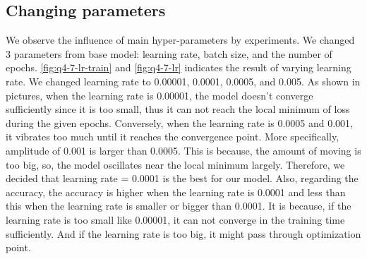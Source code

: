 \subsection{Changing parameters}
We observe the influence of main hyper-parameters by experiments. We changed 3 parameters from base model: learning rate, batch size, and the number of epochs. \cref{fig:q4-7-lr-train} and \cref{fig:q4-7-lr} indicates the result of varying learning rate. We changed learning rate to 0.00001, 0.0001, 0.0005, and 0.005. As shown in pictures, when the learning rate is 0.00001, the model doesn't converge sufficiently since it is too small, thus it can not reach the local minimum of loss during the given epochs. Conversely, when the learning rate is 0.0005 and 0.001, it vibrates too much until it reaches the convergence point. More specifically, amplitude of 0.001 is larger than 0.0005. This is because, the amount of moving is too big, so, the model oscillates near the local minimum largely. Therefore, we decided that learning rate = 0.0001 is the best for our model. Also, regarding the accuracy, the accuracy is higher when the learning rate is 0.0001 and less than this when the learning rate is smaller or bigger than 0.0001. It is because, if the learning rate is too small like 0.00001, it can not converge in the training time sufficiently. And if the learning rate is too big, it might pass through optimization point.

